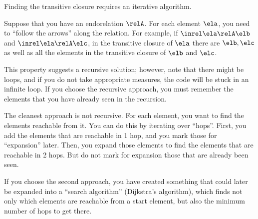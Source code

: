 
\begin{hint}
    Finding the transitive closure requires an iterative algorithm.

    Suppose that you have an endorelation $\relA$.
    For each element $\ela$, you need to ``follow the arrows'' along the relation.
    For example, if  $\inrel \ela \relA \elb$ and  $\inrel \ela \relA \elc$, in the transitive closure of $\ela$ there are $\elb, \elc$ as well as all the elements in the transitive closure of $\elb$ and $\elc$.

    This property suggests a recursive solution; however, note that there might be loops, and if you do not take appropriate measures, the code will be stuck in an infinite loop.
    If you choose the recursive approach, you must remember the elements that you have already seen in the recursion.

    The cleanest approach is not recursive.
    For each element, you want to find the elements reachable from it.
    You can do this by iterating over ``hops''.
    First, you add the elements that are reachable in 1 hop, and you mark those for ``expansion'' later.
    Then, you expand those elements to find the elements that are reachable in 2 hops.
    But do not mark for expansion those that are already been seen.

    If you choose the second approach, you have created something that could later be expanded into a ``search algorithm'' (Dijkstra's algorithm), which finds not only which elements are reachable from a start element, but also the minimum number of hops to get there.
\end{hint}
